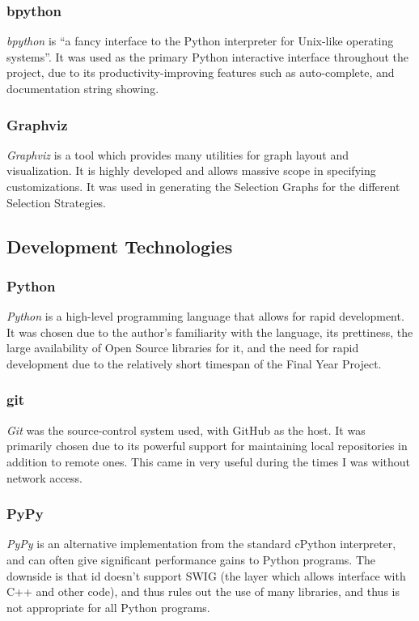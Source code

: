 \documentclass[a4paper,11pt]{report}
\begin{document}
\subsubsection*{bpython}
\emph{bpython} \citep{prog:bpython} is ``a fancy interface to the Python interpreter for Unix-like operating systems''. It was used as the primary Python interactive interface throughout the project, due to its productivity-improving features such as auto-complete, and documentation string showing.

\subsubsection*{Graphviz}
\emph{Graphviz} \citep{prog:graphviz} is a tool which provides many utilities for graph layout and visualization. It is highly developed and allows massive scope in specifying customizations. It was used in generating the Selection Graphs for the different Selection Strategies. 

\subsection{Development Technologies}

\subsubsection*{Python}
\emph{Python} \citep{prog:python} is a high-level programming language that allows for rapid development. It was chosen due to the author's familiarity with the language, its prettiness, the large availability of Open Source libraries for it, and the need for rapid development due to the relatively short timespan of the Final Year Project.

\subsubsection*{git}
\emph{Git} \citep{prog:git} was the source-control system used, with GitHub as the host. It was primarily chosen due to its powerful support for maintaining local repositories in addition to remote ones. This came in very useful during the times I was without network access.

\subsubsection*{PyPy}
\emph{PyPy} \citep{prog:pypy} is an alternative implementation from the standard cPython interpreter, and can often give significant performance gains to Python programs. The downside is that id doesn't support SWIG (the layer which allows interface with C++ and other code), and thus rules out the use of many libraries, and thus is not appropriate for all Python programs.
\end{document}
